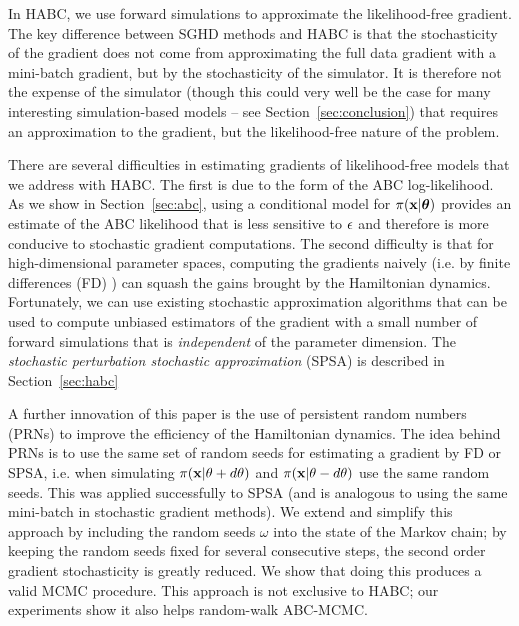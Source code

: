 \documentclass[]{article}
\begin{document}
In HABC, we use forward simulations to approximate the likelihood-free gradient. The key difference between SGHD methods and HABC is that the stochasticity of the gradient does not come from approximating the full data gradient with a mini-batch gradient, but by the stochasticity of the simulator.  It is therefore not the expense of the simulator (though this could very well be the case for many interesting simulation-based models -- see Section~\ref{sec:conclusion}) that requires an approximation to the gradient, but the likelihood-free nature of the problem.  

There are several difficulties in estimating gradients of likelihood-free models that we address with HABC.  The first is due to the form of the ABC log-likelihood.  As we show in Section~\ref{sec:abc}, using a conditional model for $\pi( {\bf x} | {\bm \theta} )$ provides an estimate of the ABC likelihood that is less sensitive to $\epsilon$ and therefore is more conducive to stochastic gradient computations.  The second difficulty is that for high-dimensional parameter spaces, computing the gradients naively (i.e. by finite differences (FD) \cite{kiefer1952stochastic}) can squash the gains brought by the Hamiltonian dynamics.  Fortunately, we can use existing stochastic approximation algorithms \cite{spall1992multivariate,spall2000adaptive} that can be used to compute unbiased estimators of the gradient with a small number of forward simulations that is {\em independent} of the parameter dimension.  The {\em stochastic perturbation stochastic approximation} (SPSA) \cite{spall1992multivariate} is described in Section~\ref{sec:habc}

A further innovation of this paper is the use of persistent random numbers (PRNs) to improve the efficiency of the Hamiltonian dynamics.  The idea behind PRNs is to use the same set of random seeds for estimating a gradient by FD or SPSA, i.e. when simulating $\pi({\bf x}| \theta + d\theta)$ and $\pi({\bf x}| \theta - d\theta)$ use the same random seeds.  This was applied successfully to SPSA \cite{kleinman1999simulation} (and is analogous to using the same mini-batch in stochastic gradient methods).  We extend and simplify this approach by including the random seeds $\omega$ into the state of the Markov chain;  by keeping the random seeds fixed for several consecutive steps, the second order gradient stochasticity is greatly reduced.  We show that doing this produces a valid MCMC procedure.  This approach is not exclusive to HABC; our experiments show it also helps random-walk ABC-MCMC.
\end{document}
